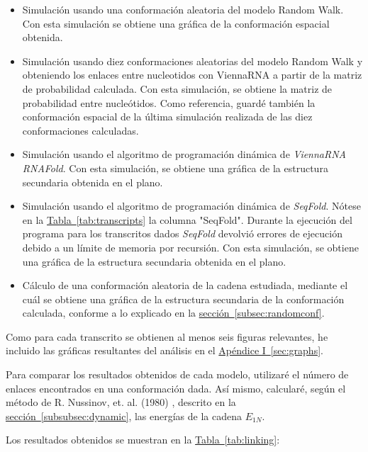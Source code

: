\documentclass[a4paper,11pt,titlepage]{article}
\newcommand{\nr}[2][sección]{\hyperref[#2]{#1~\ref{#2}}}
\theoremstyle{definition}
\begin{document}
\begin{itemize}
    \item Simulación usando una conformación aleatoria del modelo Random Walk. Con esta simulación se obtiene una gráfica de la conformación espacial obtenida.
    \item Simulación usando diez conformaciones aleatorias del modelo Random Walk y obteniendo los enlaces entre nucleotidos con ViennaRNA a partir de la matriz de probabilidad calculada. Con esta simulación, se obtiene la matriz de probabilidad entre nucleótidos. Como referencia, guardé también la conformación espacial de la última simulación realizada de las diez conformaciones calculadas.
    \item Simulación usando el algoritmo de programación dinámica de \textit{ViennaRNA RNAFold}. Con esta simulación, se obtiene una gráfica de la estructura secundaria obtenida en el plano. 
    \item Simulación usando el algoritmo de programación dinámica de \textit{SeqFold}. Nótese en la \nr[Tabla]{tab:transcripts} la columna "SeqFold". Durante la ejecución del programa para los transcritos dados \textit{SeqFold} devolvió errores de ejecución debido a un límite de memoria por recursión. Con esta simulación, se obtiene una gráfica de la estructura secundaria obtenida en el plano. 
    \item Cálculo de una conformación aleatoria de la cadena estudiada, mediante el cuál se obtiene una gráfica de la estructura secundaria de la conformación calculada, conforme a lo explicado en la \nr[sección]{subsec:randomconf}.
\end{itemize}


Como para cada transcrito se obtienen al menos seis figuras relevantes, he incluido las gráficas resultantes del análisis en el \nr[Apéndice I]{sec:graphs}.

Para comparar los resultados obtenidos de cada modelo, utilizaré el número de enlaces encontrados en una conformación dada. Así mismo, calcularé, según el método de R. Nussinov, et. al. (1980) \cite{nussinov}, descrito en la \nr[sección]{subsubsec:dynamic}, las energías de la cadena $E_{1N}$.

Los resultados obtenidos se muestran en la \nr[Tabla]{tab:linking}:
\end{document}
